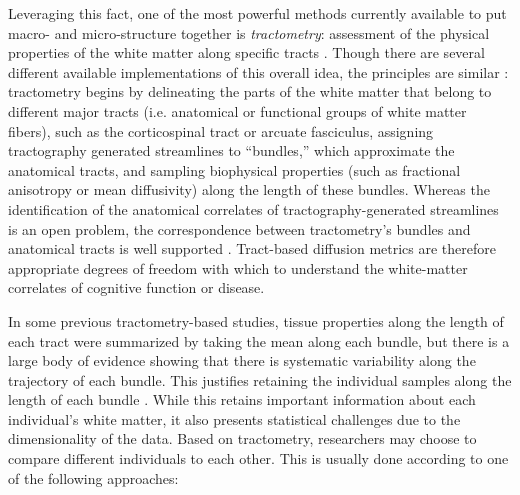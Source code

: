 Leveraging this fact, one of the most powerful methods currently
available to put macro- and micro-structure together is
\emph{tractometry}: assessment of the physical properties of the white
matter along specific tracts \cite{Bells2011-cf}. Though there are
several different available implementations of this overall idea,
the principles are similar \cite{yeatman2012tract, Yendiki2011-ay,
Wassermann2016-iv, ODonnell2009-uu}: tractometry begins by delineating
the parts of the white matter that belong to different major tracts
(i.e. anatomical or functional groups of white matter fibers),
such as the corticospinal tract or arcuate fasciculus, assigning
tractography generated streamlines to ``bundles,'' which approximate
the anatomical tracts, and sampling biophysical properties (such as
fractional anisotropy or mean diffusivity) along the length of these
bundles. Whereas the identification of the anatomical correlates
of tractography-generated streamlines is an open problem, the
correspondence between tractometry's bundles and anatomical tracts is
well supported \cite{Catani2002-vu}. Tract-based diffusion metrics are
therefore appropriate degrees of freedom with which to understand the
white-matter correlates of cognitive function or disease.

In some previous tractometry-based studies, tissue properties along
the length of each tract were summarized by taking the mean along
each bundle, but there is a large body of evidence showing that there
is systematic variability along the trajectory of each bundle. This
justifies retaining the individual samples along the length of each
bundle \cite{yeatman2012tract, colby2012, ODonnell2009-uu}. While this
retains important information about each individual's white matter, it
also presents statistical challenges due to the dimensionality of the
data. Based on tractometry, researchers may choose to compare different
individuals to each other. This is usually done according to one of the
following approaches:

